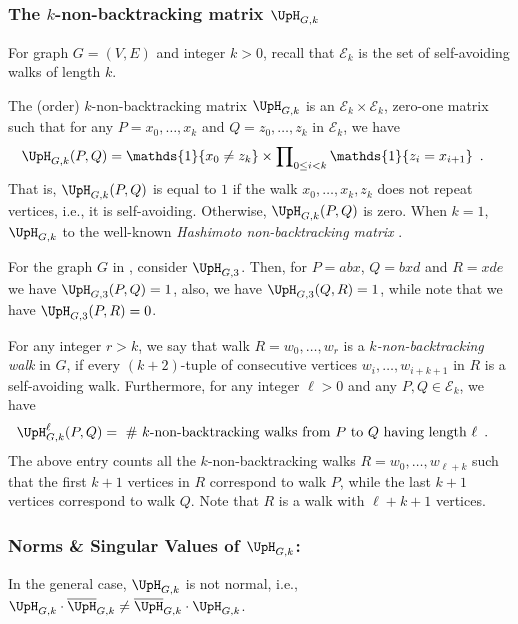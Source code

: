 \documentclass[11pt,reqno]{amsart}
\numberwithin{equation}{section}
\newcommand{\cE}{{\mathcal{E}}}
\newcommand{\applegreen}[1]{ {\color{applegreen}#1}}
\newcommand{\amethyst}[1]{{\color{amethyst}#1} }
\newcommand{\blue}[1]{{\color{blue}#1}}
\newcommand{\bluepigment}[1]{{\color{blue(pigment)}#1}}
\newcommand{\byzantine}[1]{{\color{byzantine}#1}}
\newcommand{\bostonuniversityred}[1]{{\color{bostonuniversityred}#1}}
\newcommand{\capri}[1]{{\color{capri}#1}}
\newcommand{\cadmiumgreen}[1]{{\color{cadmiumgreen}#1}}
\newcommand{\deeppink}[1]{{\color{deeppink}#1}}
\newcommand{\electricviolet}[1]{{\color{electricviolet}#1}}
\newcommand{\goldenbrown}[1]{{\color{goldenbrown}#1}}
\newcommand{\heliotrope}[1]{{\color{heliotrope}#1}}
\newcommand{\iris}[1]{{\color{iris}#1}}
\newcommand{\red}[1]{{\color{red}#1}}
\newcommand{\Ind}{\mathds{1}}
\newcommand{\ExtV}{\iris{\cE}}
\newcommand{\MTR}[1]{\overline{#1}}
\newcommand{\NBMatrix}{\cadmiumgreen{\UpH}_{G,\kk}}
\newcommand{\NBMatrixE}{\byzantine{\UpH}}
\renewcommand{\applegreen}[1]{#1}
\renewcommand{\amethyst}[1]{#1}
\renewcommand{\blue}[1]{#1}
\renewcommand{\bluepigment}[1]{#1}
\renewcommand{\byzantine}[1]{#1}
\renewcommand{\bostonuniversityred}[1]{#1}
\renewcommand{\capri}[1]{#1}
\renewcommand{\cadmiumgreen}[1]{#1}
\renewcommand{\deeppink}[1]{#1}
\renewcommand{\electricviolet}[1]{#1}
\renewcommand{\goldenbrown}[1]{#1}
\renewcommand{\heliotrope}[1]{#1}
\renewcommand{\iris}[1]{#1}
\renewcommand{\red}[1]{#1}
\newcommand{\ka}{\electricviolet{a}}
\newcommand{\kb}{\deeppink{b}}
\newcommand{\kc}{\deeppink{c}}
\newcommand{\kd}{\goldenbrown{d}}
\newcommand{\ke}{\blue{e}}
\newcommand{\ki}{\capri{i}}
\newcommand{\kk}{\bluepigment{k}}
\newcommand{\kell}{{\color{green(pigment)}\ell}}%
\newcommand{\kP}{\goldenbrown{P}}
\newcommand{\kQ}{\amethyst{Q}}
\newcommand{\kR}{\bostonuniversityred{R}}%
\newcommand{\kr}{\bostonuniversityred{r}}%
\newcommand{\kw}{\blue{w}}
\newcommand{\kx}{\heliotrope{x}}
\newcommand{\kz}{\cadmiumgreen{z}}
\renewcommand{\ka}{a}
\renewcommand{\kb}{b}
\renewcommand{\kc}{x}
\renewcommand{\kd}{d}
\renewcommand{\ke}{e}
\renewcommand{\ki}{i}
\renewcommand{\kk}{k}
\renewcommand{\kell}{\ell}
\renewcommand{\kP}{P}
\renewcommand{\kQ}{Q}
\renewcommand{\kR}{R}
\renewcommand{\kr}{r}
\renewcommand{\kw}{w}
\renewcommand{\kx}{x}
\renewcommand{\kz}{z}
\begin{document}
\subsubsection{The $\kk$-non-backtracking matrix $\NBMatrix$}
 For graph $G=(V,E)$ and integer $\kk>0$, recall that $\ExtV_{\kk}$ is the set of self-avoiding walks of length $\kk$. 
 
 
% 
 The (order) $\kk$-non-backtracking matrix $\NBMatrix$ is an $\ExtV_{\kk} \times \ExtV_{\kk}$, zero-one matrix 
 such that for any $\kP=\kx_0,\ldots, \kx_{\kk}$ and $\kQ=\kz_0, \ldots, \kz_{\kk}$ in $\ExtV_{\kk}$, we have 
\begin{align}\label{eq:DefOfKNBMatrix}
\NBMatrix(\kP, \kQ) &=\Ind\{\kx_0 \neq \kz_{\kk} \}\times \prod\nolimits_{0\leq \ki <\kk}\Ind\{\kz_{\ki} = \kx_{\ki+1}\} \enspace.
\end{align}
That is, $\NBMatrix(\kP, \kQ)$ is equal to $1$ if the walk $\kx_0, \ldots, \kx_{\kk}, \kz_{\kk}$  does not repeat vertices, i.e.,
it is self-avoiding. Otherwise, $\NBMatrix(\kP, \kQ)$ is zero. 
%
When $\kk=1$, $\NBMatrix$  to the well-known {\em Hashimoto non-backtracking matrix} \cite{Hash89}.


For the graph $G$ in , consider $\NBMatrixE_{G,3}$.
Then, for $\kP=\ka\kb\kc$, $\kQ=\kb\kc \kd$ and $\kR=\kc \kd \ke$ 
we have $\NBMatrixE_{G,3}(\kP, \kQ)=1$, also, we have $\NBMatrixE_{G,3}(\kQ,\kR)=1$, while note that we have 
$\NBMatrixE_{G,3}(\kP, \kR)=0$.


 
For any integer $\kr>\kk$, we say that walk $\kR=\kw_{0},\ldots, \kw_{\kr}$ is a {\em $\kk$-non-backtracking 
walk} in $G$, if every $(\kk+2)$-tuple of consecutive vertices $\kw_{\ki}, \ldots, \kw_{\ki+\kk+1}$ 
in $\kR$ is a self-avoiding walk.
%
Furthermore, for any integer $\kell>0$ and any $\kP,\kQ\in \ExtV_{\kk}$, we have 
\begin{align}
\NBMatrix^{\kell}(\kP,\kQ) &=\textrm{ $\#$ $\kk$-non-backtracking walks from $\kP$ to $\kQ$ having length $\kell$} \enspace.
\end{align}
The above entry counts all the $\kk$-non-backtracking walks $\kR=\kw_0, \ldots, \kw_{\kell+\kk}$ such that the first $\kk+1$ vertices
in $\kR$ correspond to  walk $\kP$, while the last $\kk+1$ vertices correspond to walk $\kQ$. 
Note that $\kR$ is a walk with $\kell+\kk+1$ vertices. 




\subsubsection*{Norms \& Singular Values of $\NBMatrix$:}
In the general case, $\NBMatrix$ is not normal, i.e., $\NBMatrix\cdot \MTR{\NBMatrixE}_{G,\kk} \neq \MTR{\NBMatrixE}_{G,\kk}\cdot {\NBMatrix}$.
\end{document}
